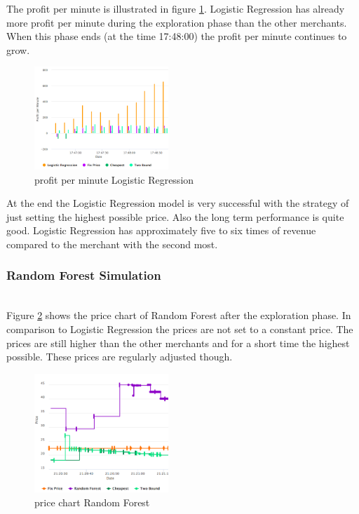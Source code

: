     The profit per minute is illustrated in figure \ref{fig4}. Logistic Regression has already more profit per minute during the exploration phase than the other merchants. When this phase ends (at the time 17:48:00) the profit per minute continues to grow.

    \begin{figure}[ht]
        \centering
        \includegraphics[width=0.45\textwidth]{img/logit_profit_per_min.png}
        \caption{profit per minute Logistic Regression}
        \label{fig4}
    \end{figure}

    At the end the Logistic Regression model is very successful with the strategy of just setting the highest possible price. Also the long term performance is quite good. Logistic Regression has approximately five to six times of revenue compared to the merchant with the second most.


\subsubsection{Random Forest Simulation}
    ~\\
    Figure \ref{fig5} shows the price chart of Random Forest after the exploration phase. In comparison to Logistic Regression the prices are not set to a constant price. The prices are still higher than the other merchants and for a short time the highest possible. These prices are regularly adjusted though.
    \begin{figure}[ht]
        \centering
        \includegraphics[width=0.45\textwidth]{img/rndmfrst_prices.png}
        \caption{price chart Random Forest}
        \label{fig5}
    \end{figure}

